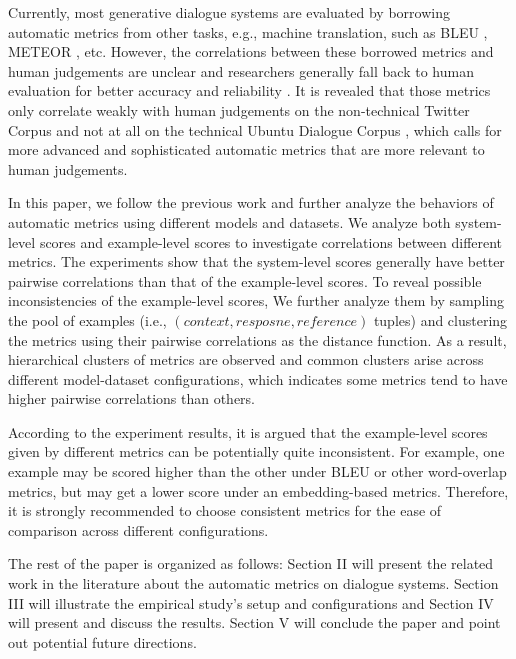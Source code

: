 \documentclass[conference]{IEEEtran}
\begin{document}
Currently, most generative dialogue systems are evaluated by borrowing automatic metrics from other tasks, e.g., machine translation, such as BLEU \cite{BLEU}, METEOR \cite{METEOR}, etc.
However, the correlations between these borrowed metrics and human judgements are unclear and researchers generally fall back to human evaluation for better accuracy and reliability \cite{VHRED,Shang}.
It is revealed that those metrics only correlate weakly with human judgements on the non-technical Twitter Corpus and not at all on the technical Ubuntu Dialogue Corpus \cite{HowNot}, which calls for more advanced and sophisticated automatic metrics that are more relevant to human judgements.

In this paper, we follow the previous work and further analyze the behaviors of automatic metrics using different models and datasets. 
We analyze both system-level scores and example-level scores to investigate correlations between different metrics.
The experiments show that the system-level scores generally have better pairwise correlations than that of the example-level scores.
To reveal possible inconsistencies of the example-level scores,
We further analyze them by sampling the pool of examples (i.e., $(context, resposne, reference)$ tuples) and clustering the metrics using their pairwise correlations as the distance function.
As a result, hierarchical clusters of metrics are observed and common clusters arise across different model-dataset configurations,
which indicates some metrics tend to have higher pairwise correlations than others.

According to the experiment results, it is argued that the example-level scores given by different metrics can be potentially quite inconsistent.
For example, one example may be scored higher than the other under BLEU or other word-overlap metrics, but may get a lower score under an embedding-based metrics.
Therefore, it is strongly recommended to choose consistent metrics for the ease of comparison across different configurations.

The rest of the paper is organized as follows: Section II will present the related work in the literature about the automatic metrics on dialogue systems.
Section III will illustrate the empirical study's setup and configurations and Section IV will present and discuss the results.
Section V will conclude the paper and point out potential future directions.
\end{document}
